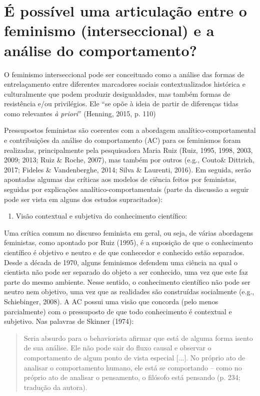 \section{É possível uma articulação entre o feminismo (interseccional) e a análise do comportamento?}

O feminismo interseccional pode ser conceituado como a análise das formas de entrelaçamento entre diferentes marcadores sociais contextualizados histórica e culturalmente que podem produzir desigualdades, mas também formas de resistência e/ou privilégios. Ele ``se opõe à ideia de partir de diferenças tidas como relevantes \textit{à priori}'' (Henning, 2015, p. 110)

Pressupostos feministas são coerentes com a abordagem analítico-comportamental e contribuições da análise do comportamento (AC) para os feminismos foram realizadas, principalmente pela pesquisadora Maria Ruiz (Ruiz, 1995, 1998, 2003, 2009; 2013; Ruiz \& Roche, 2007), mas também por outros (e.g., Couto\& Dittrich, 2017; Fideles \& Vandenberghe, 2014; Silva \& Laurenti, 2016). Em seguida, serão apontadas algumas das críticas aos modelos de ciência feitos por feministas, seguidas por explicações analítico-comportamentais (parte da discussão a seguir pode ser vista em alguns dos estudos supracitados): 


\begin{enumerate}
    \item Visão contextual e subjetiva do conhecimento científico: 
\end{enumerate}   
Uma crítica comum no discurso feminista em geral, ou seja, de várias abordagens feministas, como apontado por Ruiz (1995), é a suposição de que o conhecimento científico é objetivo e neutro e de que conhecedor e conhecido estão separados. Desde a década de 1970, alguns feminismos defendem uma ciência na qual o cientista não pode ser separado do objeto a ser conhecido, uma vez que este faz parte do mesmo ambiente. Nesse sentido, o conhecimento científico não pode ser neutro nem objetivo, uma vez que as realidades são construídas socialmente (e.g., Schiebinger, 2008). A AC possui uma visão que concorda (pelo menos parcialmente) com o pressuposto de que todo conhecimento é contextual e subjetivo. Nas palavras de Skinner (1974):

\begin{quote}
    Seria absurdo para o behaviorista afirmar que está de alguma forma isento de sua análise. Ele não pode sair do fluxo causal e observar o comportamento de algum ponto de vista especial [...]. No próprio ato de analisar o comportamento humano, ele está se comportando – como no próprio ato de analisar o pensamento, o filósofo está pensando (p. 234; tradução da autora).
\end{quote}

